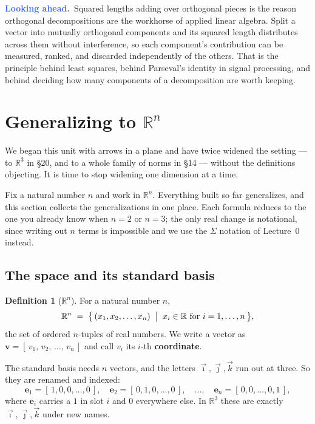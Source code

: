\documentclass[11pt]{article}
\theoremstyle{definition}
\newtheorem{defn}{Definition}[section]
\theoremstyle{remark}
\newcommand{\lookahead}{\par\smallskip\noindent
  \textbf{\sffamily\textcolor{RoyalBlue}{Looking ahead.}}\ \ignorespaces}
\newcommand{\R}{\mathbb{R}}
\newcommand{\vc}[1]{\mathbf{#1}}
\newcommand{\ivec}{\vec{\imath}}
\newcommand{\jvec}{\vec{\jmath}}
\newcommand{\kvec}{\vec{k}}
\begin{document}
\lookahead Squared lengths adding over orthogonal pieces is the reason
orthogonal decompositions are the workhorse of applied linear algebra. Split a
vector into mutually orthogonal components and its squared length distributes
across them without interference, so each component's contribution can be
measured, ranked, and discarded independently of the others. That is the
principle behind least squares, behind Parseval's identity in signal
processing, and behind deciding how many components of a decomposition are worth
keeping.

\section{Generalizing to \texorpdfstring{$\R^{n}$}{Rn}}
We began this unit with arrows in a plane and have twice widened the setting ---
to $\R^{3}$ in \S20, and to a whole family of norms in \S14 --- without the
definitions objecting. It is time to stop widening one dimension at a time.

Fix a natural number $n$ and work in $\R^{n}$. Everything built so far
generalizes, and this section collects the generalizations in one place. Each
formula reduces to the one you already know when $n=2$ or $n=3$; the only real
change is notational, since writing out $n$ terms is impossible and we use the
$\Sigma$ notation of Lecture~0 instead.

\subsection{The space and its standard basis}
\begin{defn}[$\R^{n}$]
For a natural number $n$,
\[
  \R^{n}
  \;=\;
  \bigl\{\,(x_1,x_2,\dots,x_n) \;\bigm|\; x_i\in\R \text{ for } i=1,\dots,n \,\bigr\},
\]
the set of ordered $n$-tuples of real numbers. We write a vector as
$\vc{v}=[\,v_1,\,v_2,\,\dots,\,v_n\,]$ and call $v_i$ its $i$-th
\textbf{coordinate}.
\end{defn}

\noindent The standard basis needs $n$ vectors, and the letters $\ivec,\jvec,\kvec$
run out at three. So they are renamed and indexed:
\[
  \vc{e}_1 = [\,1,0,0,\dots,0\,],\quad
  \vc{e}_2 = [\,0,1,0,\dots,0\,],\quad\dots,\quad
  \vc{e}_n = [\,0,0,\dots,0,1\,] ,
\]
where $\vc{e}_i$ carries a $1$ in slot $i$ and $0$ everywhere else. In $\R^{3}$
these are exactly $\ivec,\jvec,\kvec$ under new names.
\end{document}
